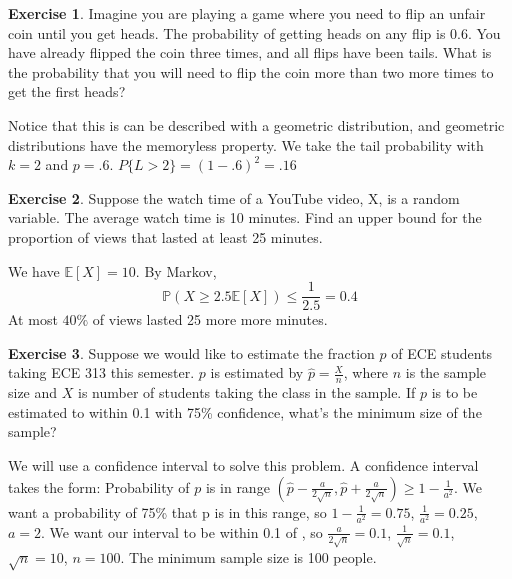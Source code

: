 \documentclass[12pt]{amsart}
\theoremstyle{definition}
\newtheorem{exercise}{Exercise}
\numberwithin{equation}{section}
\theoremstyle{plain}
\newcommand{\E}{\mathbb{E}}
\renewcommand{\P}{\mathbb{P}}
\begin{document}
 
\begin{exercise}
    Imagine you are playing a game where you need to flip an unfair coin until you get heads. The probability of getting heads on any flip is 0.6. You have already flipped the coin three times, and all flips have been tails. What is the probability that you will need to flip the coin more than two more times to get the first heads? %
    \begin{answer}
    Notice that this is can be described with a geometric distribution, and geometric distributions have the memoryless property. We take the tail probability with $k = 2$ and $p = .6$. $P\{L > 2\} = (1 - .6)^2 = .16$
    \end{answer}
\end{exercise}

 
\begin{exercise}
    Suppose the watch time of a YouTube video, X, is a random variable. The average watch time is 10 minutes. Find an upper bound for the proportion of views that lasted at least 25 minutes. %
    \begin{answer}
        We have $\E[X] = 10$. By Markov,
        \[
            \P(X \geq 2.5\E[X]) \leq \frac{1}{2.5} = 0.4
        \]
        At most $40\%$ of views lasted 25 more more minutes.
    \end{answer}
\end{exercise}

 
\begin{exercise}
    Suppose we would like to estimate the fraction $p$ of ECE students taking ECE 313 this semester. $p$ is estimated by $\widehat{p}=\frac{X}{n}$, where $n$ is the sample size and $X$ is number of students taking the class in the sample. If $p$ is to be estimated to within 0.1 with 75\% confidence, what’s the minimum size of the sample? %
\end{exercise}
\begin{answer}
    We will use a confidence interval to solve this problem. A confidence interval takes the form: Probability of $p$ is in range $(\hat{p} - \frac{a}{2\sqrt{n}}, \hat{p} + \frac{a}{2\sqrt{n}}) \geq 1 - \frac{1}{a^2}$. We want a probability of 75\% that p is in this range, so $1 - \frac{1}{a^2} = 0.75$, $\frac{1}{a^2} = 0.25$, $a = 2$. We want our interval to be within 0.1 of , so $\frac{a}{2\sqrt{n}} = 0.1$, $\frac{1}{\sqrt{n}} = 0.1$, $\sqrt{n} = 10$, $n = 100$. The minimum sample size is 100 people.
\end{answer}
\end{document}

